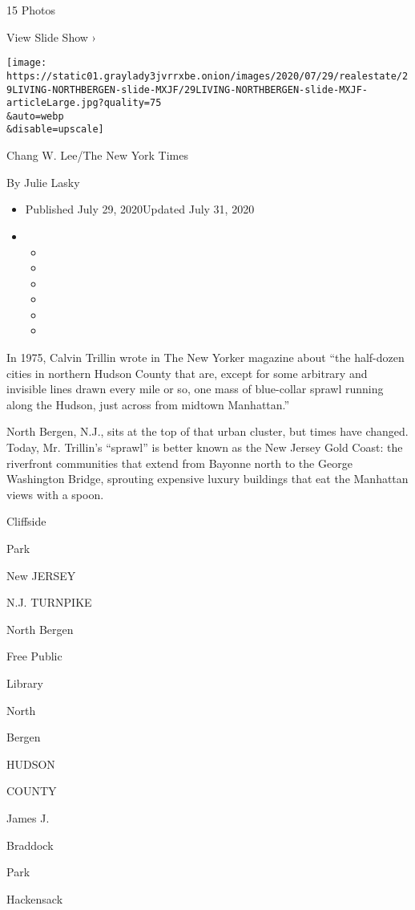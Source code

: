 15 Photos

View Slide Show ›

\texttt{[image: https://static01.graylady3jvrrxbe.onion/images/2020/07/29/realestate/29LIVING-NORTHBERGEN-slide-MXJF/29LIVING-NORTHBERGEN-slide-MXJF-articleLarge.jpg?quality=75\\\&auto=webp\\\&disable=upscale]}

Chang W. Lee/The New York Times

By Julie Lasky

\begin{itemize}
\item
  Published July 29, 2020Updated July 31, 2020
\item
  \begin{itemize}
  \item
  \item
  \item
  \item
  \item
  \item
  \end{itemize}
\end{itemize}

In 1975, Calvin Trillin wrote in The New Yorker magazine about ``the
half-dozen cities in northern Hudson County that are, except for some
arbitrary and invisible lines drawn every mile or so, one mass of
blue-collar sprawl running along the Hudson, just across from midtown
Manhattan.''

North Bergen, N.J., sits at the top of that urban cluster, but times
have changed. Today, Mr. Trillin's ``sprawl'' is better known as the New
Jersey Gold Coast: the riverfront communities that extend from Bayonne
north to the George Washington Bridge, sprouting expensive luxury
buildings that eat the Manhattan views with a spoon.

Cliffside

Park

New JERSEY

N.J. TURNPIKE

North Bergen

Free Public

Library

North

Bergen

HUDSON

COUNTY

James J.

Braddock

Park

Hackensack

